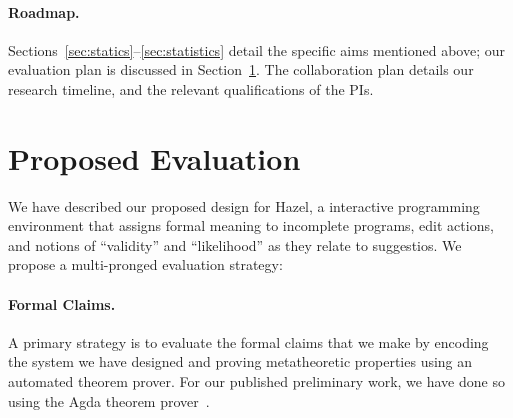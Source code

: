 \documentclass[letterpaper,USenglish]{lipics-v2016}
\newcommand{\Hazel}[0]{\textsf{Hazel}}
\newcommand{\HazelEnv}[0]{\Hazel}
\begin{document}
\clearpage


\paragraph{Roadmap.} Sections~\ref{sec:statics}--\ref{sec:statistics} detail the
specific aims mentioned above; our evaluation plan is discussed in Section~\ref{sec:eval}.
The collaboration plan details our 
research timeline, and the relevant qualifications of the PIs.












\section{Proposed Evaluation}
\label{sec:eval}

We have described our proposed design for \HazelEnv, a interactive programming environment that assigns formal meaning  
to incomplete programs, edit actions, and notions of ``validity'' and
``likelihood'' as they relate to suggestios. We propose a multi-pronged evaluation
strategy: 

\paragraph{Formal Claims.} 
A primary strategy is to evaluate the formal claims that we make by encoding
the system we have designed and proving metatheoretic properties using an
automated theorem prover. For our published preliminary work, we have done so
using the Agda theorem prover~\cite{norell2009dependently}.
\end{document}
